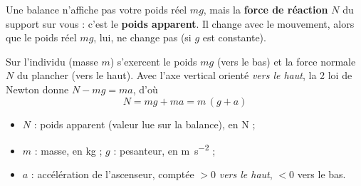 \documentclass[11pt,a4paper]{article}
\begin{document}

Une balance n'affiche pas votre poids réel $mg$, mais la \textbf{force de réaction}
$N$ du support sur vous : c'est le \textbf{poids apparent}. Il change avec le
mouvement, alors que le poids réel $mg$, lui, ne change pas (si $g$ est constante).

\begin{cle}
Sur l'individu (masse $m$) s'exercent le poids $mg$ (vers le bas) et la force normale
$N$ du plancher (vers le haut). Avec l'axe vertical orienté \emph{vers le haut}, la
2 loi de Newton donne $N-mg=ma$, d'où
\[
\boxed{\,N=mg+ma=m\,(g+a)\,}
\]
\begin{itemize}[leftmargin=1.5em,topsep=1pt,itemsep=0pt]
  \item $N$ : poids apparent (valeur lue sur la balance), en \si{\newton} ;
  \item $m$ : masse, en \si{\kilogram} ; \quad $g$ : pesanteur, en \si{\metre\per\second\squared} ;
  \item $a$ : accélération de l'ascenseur, comptée $>0$ \emph{vers le haut}, $<0$ vers le bas.
\end{itemize}
\end{cle}
\end{document}
